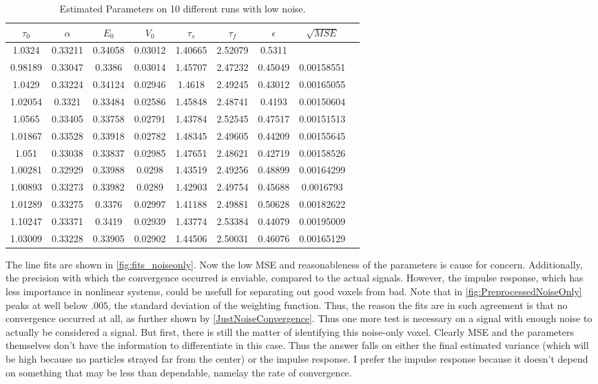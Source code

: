 \begin{table}[t]
\centering
\begin{tabular}{|c | c | c | c | c | c | c | c | c |}
\hline 
$\tau_0$ & $\alpha$ & $E_0$    & $V_0$    & $\tau_s$ & $\tau_f$ & $\epsilon$  &  $\sqrt{MSE}$   \\
\hline 
1.0324 & 0.33211 & 0.34058 & 0.03012 & 1.40665 & 2.52079 & 0.5311 & \\
 0.98189 & 0.33047 & 0.3386 & 0.03014 & 1.45707 & 2.47232 & 0.45049 & 0.00158551 \\
 1.0429 & 0.33224 & 0.34124 & 0.02946 & 1.4618 & 2.49245 & 0.43012 &  0.00165055 \\
 1.02054 & 0.3321 & 0.33484 & 0.02586 & 1.45848 & 2.48741 & 0.4193 &  0.00150604 \\
 1.0565 & 0.33405 & 0.33758 & 0.02791 & 1.43784 & 2.52545 & 0.47517 & 0.00151513 \\
 1.01867 & 0.33528 & 0.33918 & 0.02782 & 1.48345 & 2.49605 & 0.44209 &0.00155645 \\
 1.051 & 0.33038 & 0.33837 & 0.02985 & 1.47651 & 2.48621 & 0.42719 &  0.00158526 \\
 1.00281 & 0.32929 & 0.33988 & 0.0298 & 1.43519 & 2.49256 & 0.48899 & 0.00164299 \\
 1.00893 & 0.33273 & 0.33982 & 0.0289 & 1.42903 & 2.49754 & 0.45688 & 0.0016793  \\
 1.01289 & 0.33275 & 0.3376 & 0.02997 & 1.41188 & 2.49881 & 0.50628 & 0.00182622 \\
 1.10247 & 0.33371 & 0.3419 & 0.02939 & 1.43774 & 2.53384 & 0.44079 & 0.00195009 \\
\hline                                                                
1.03009 & 0.33228 & 0.33905 & 0.02902 & 1.44506 & 2.50031 & 0.46076 & 0.00165129 \\
\hline 
\end{tabular}
\caption{Estimated Parameters on 10 different runs with low noise. }
\label{tab:NoiseOnlyResults} 
\end{table}

The line fits are shown in \autoref{fig:fits_noiseonly}. Now the
low MSE and reasonableness of the parameters is cause for concern. Additionally, the precision
with which the convergence occurred is enviable, compared to the actual signals.
However, the impulse response, which has less importance in nonlinear systems, could
be usefull for separating out good voxels from bad. Note that in \autoref{fig:PreprocessedNoiseOnly}
peaks at well below $.005$, the standard deviation of the weighting function. Thus, the reason
the fits are in such agreement is that no convergence occurred at all, as 
further shown by \autoref{JustNoiseConvergence}. Thus one more test is necessary on
a signal with enough noise to actually be considered a signal. But first,
there is still the matter of identifying this noise-only voxel. Clearly MSE and
the parameters themselves don't have the information to differentiate in this case.
Thus the answer falls on either the final estimated variance (which will be high
because no particles strayed far from the center) or the impulse response.
I prefer the impulse response because it doesn't depend on something that 
may be less than dependable, namelay the rate of convergence.

